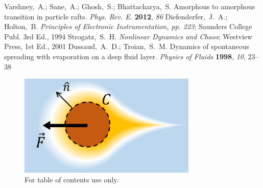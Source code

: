 \documentclass[journal=langd5, manuscript=article, layout=twocolumn]{achemso}
\begin{document}
\begin{mcitethebibliography}{27}
\mciteSetBstMidEndSepPunct{\mcitedefaultmidpunct}
{\mcitedefaultendpunct}{\mcitedefaultseppunct}\relax
\EndOfBibitem
{}
Varshney,~A.; Sane,~A.; Ghosh,~S.; Bhattacharya,~S. Amorphous to amorphous
  transition in particle rafts. \emph{Phys. Rev. E.} \textbf{2012},
  \emph{86}\relax
\mciteBstWouldAddEndPuncttrue
\mciteSetBstMidEndSepPunct{\mcitedefaultmidpunct}
{\mcitedefaultendpunct}{\mcitedefaultseppunct}\relax
\EndOfBibitem
{}
Diefenderfer,~J.~A.; Holton,~B. \emph{Principles of Electronic Instrumentation,
  pp. 223}; Saunders College Publ. 3rd Ed., 1994\relax
\mciteBstWouldAddEndPuncttrue
\mciteSetBstMidEndSepPunct{\mcitedefaultmidpunct}
{\mcitedefaultendpunct}{\mcitedefaultseppunct}\relax
\EndOfBibitem
{}
Strogatz,~S.~H. \emph{Nonlinear Dynamics and Chaos}; Westview Press, 1st Ed.,
  2001\relax
\mciteBstWouldAddEndPuncttrue
\mciteSetBstMidEndSepPunct{\mcitedefaultmidpunct}
{\mcitedefaultendpunct}{\mcitedefaultseppunct}\relax
\EndOfBibitem
{}
Dussaud,~A.~D.; Troian,~S.~M. Dynamics of spontaneous spreading with
  evaporation on a deep fluid layer. \emph{Physics of Fluids} \textbf{1998},
  \emph{10}, 23--38\relax
\mciteBstWouldAddEndPuncttrue
\mciteSetBstMidEndSepPunct{\mcitedefaultmidpunct}
{\mcitedefaultendpunct}{\mcitedefaultseppunct}\relax
\EndOfBibitem
\end{mcitethebibliography}

% 

\newpage
\begin{figure}
\centerline{\includegraphics[width=8.5cm]{figures/figtoc}}
\caption{For table of contents use only.}
\end{figure}
\end{document}
